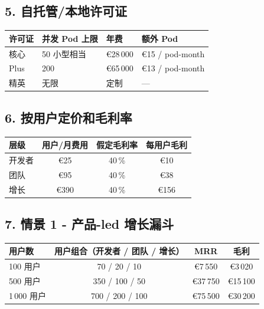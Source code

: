 \documentclass[11pt, a4paper, oneside]{article}
\begin{document}
\subsection*{5. 自托管/本地许可证}
\begin{center}
\begin{tabular}{@{}llll@{}}
\toprule
\textbf{许可证} & \textbf{并发 Pod 上限} & \textbf{年费} & \textbf{额外 Pod} \\
\midrule
核心 & 50 小型相当 & €28\,000 & €15 / pod-month \\
Plus & 200 & €65\,000 & €13 / pod-month \\
精英 & 无限 & 定制 & --- \\
\bottomrule
\end{tabular}
\end{center}

\subsection*{6. 按用户定价和毛利率}
\begin{center}
\begin{tabular}{@{}lccc@{}}
\toprule
\textbf{层级} & \textbf{用户/月费用} & \textbf{假定毛利率} & \textbf{每用户毛利} \\
\midrule
开发者 & €25 & 40\,\% & €10 \\
团队    & €95 & 40\,\% & €38 \\
增长    & €390 & 40\,\% & €156 \\
\bottomrule
\end{tabular}
\end{center}

\subsection*{7. 情景 1 - 产品-led 增长漏斗}
\begin{center}
\begin{tabular}{@{}lccc@{}}
\toprule
\textbf{用户数} & \textbf{用户组合}（开发者 / 团队 / 增长） & \textbf{MRR} & \textbf{毛利} \\
\midrule
100 用户   & 70 / 20 / 10    & €7\,550   & €3\,020  \\
500 用户   & 350 / 100 / 50  & €37\,750  & €15\,100 \\
1\,000 用户 & 700 / 200 / 100 & €75\,500  & €30\,200 \\
\bottomrule
\end{tabular}
\end{center}
\end{document}
